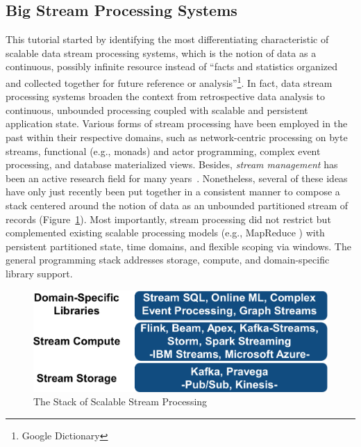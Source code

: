 
\subsection{Big Stream Processing Systems}
\label{sec:tut_systems}

This tutorial started by identifying the most differentiating characteristic of scalable data stream processing systems, which is the notion of data as a continuous, possibly infinite resource instead of ``facts and statistics organized and collected together for future reference or analysis''\footnote{Google Dictionary}. In fact, data stream processing systems broaden the context from retrospective data analysis to continuous, unbounded processing coupled with scalable and persistent application state.  Various forms of stream processing have been employed in the past within their respective domains, such as network-centric processing on byte streams, functional (e.g., monads) and actor programming, complex event processing, and database materialized views. Besides, \emph{stream management} has been an active research field for many years~\cite{abadi2003aurora,arasu_babu_widom_2006,chandrasekaran2003telegraphcq}. Nonetheless, several of these ideas have  only just recently been put together in a consistent manner to compose a stack  centered around the notion of data as an unbounded partitioned stream of records (Figure~\ref{fig:streamstack}). Most importantly, stream processing did not restrict but complemented existing scalable processing models (e.g., MapReduce \cite{dean2008mapreduce}) with persistent partitioned state, time domains, and flexible scoping via \mbox{windows}. The general programming stack  addresses storage, compute, and domain-specific library support.

\begin{figure}[t]
\centering
\includegraphics[width=0.4 \textwidth]{pictures/streamstack.pdf}
\vspace*{-1mm}
\caption{The Stack of Scalable Stream Processing}
\label{fig:streamstack}
\vspace*{-2mm}
\end{figure}

